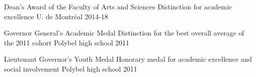 

\begin{cvhonors}

  \cvhonor
    {Dean's Award of the Faculty of Arts and Sciences} %
    {Distinction for academic excellence} %
    {U. de Montréal} %
    {2014-18} %

  \cvhonor
    {Governor General's Academic Medal} %
    {Distinction for the best overall average of the 2011 cohort} %
    {Polybel high school} %
    {2011} %

  \cvhonor
    {Lieutenant Governor's Youth Medal} %
    {Honorary medal for academic excellence and social involvement} %
    {Polybel high school} %
    {2011} %

\end{cvhonors}